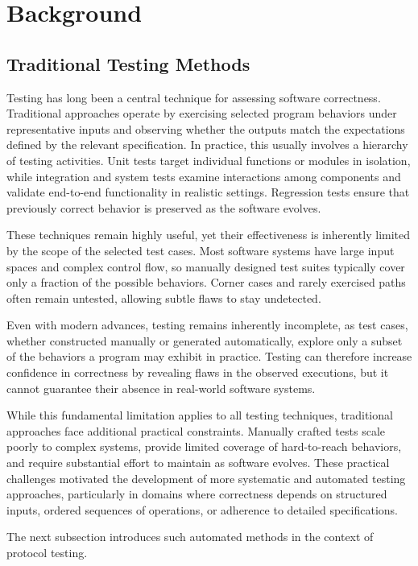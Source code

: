 \chapter{Background}\label{chapter:background}
\section{Traditional Testing Methods}
Testing has long been a central technique for assessing software correctness.
Traditional approaches operate by exercising selected program behaviors under representative inputs and observing whether the outputs match the expectations defined by the relevant specification.
In practice, this usually involves a hierarchy of testing activities.
Unit tests target individual functions or modules in isolation, while integration and system tests examine interactions among components and validate end-to-end functionality in realistic settings.
Regression tests ensure that previously correct behavior is preserved as the software evolves.

These techniques remain highly useful, yet their effectiveness is inherently limited by the scope of the selected test cases.
Most software systems have large input spaces and complex control flow, so manually designed test suites typically cover only a fraction of the possible behaviors.
Corner cases and rarely exercised paths often remain untested, allowing subtle flaws to stay undetected.

Even with modern advances, testing remains inherently incomplete, as test cases, whether constructed manually or generated automatically, explore only a subset of the behaviors a program may exhibit in practice.
Testing can therefore increase confidence in correctness by revealing flaws in the observed executions, but it cannot guarantee their absence in real-world software systems.

While this fundamental limitation applies to all testing techniques, traditional approaches face additional practical constraints.
Manually crafted tests scale poorly to complex systems, provide limited coverage of hard-to-reach behaviors, and require substantial effort to maintain as software evolves.
These practical challenges motivated the development of more systematic and automated testing approaches, particularly in domains where correctness depends on structured inputs, ordered sequences of operations, or adherence to detailed specifications.

The next subsection introduces such automated methods in the context of protocol testing.

